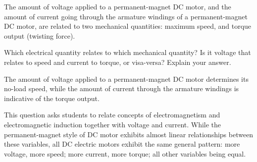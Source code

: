 

The amount of voltage applied to a permanent-magnet DC motor, and the amount of current going through the armature windings of a permanent-magnet DC motor, are related to two mechanical quantities: maximum speed, and torque output (twisting force).

Which electrical quantity relates to which mechanical quantity?  Is it voltage that relates to speed and current to torque, or visa-versa?  Explain your answer.







The amount of voltage applied to a permanent-magnet DC motor determines its no-load speed, while the amount of current through the armature windings is indicative of the torque output.







This question asks students to relate concepts of electromagnetism and electromagnetic induction together with voltage and current.  While the permanent-magnet style of DC motor exhibits almost linear relationships between these variables, all DC electric motors exhibit the same general pattern: more voltage, more speed; more current, more torque; all other variables being equal.




